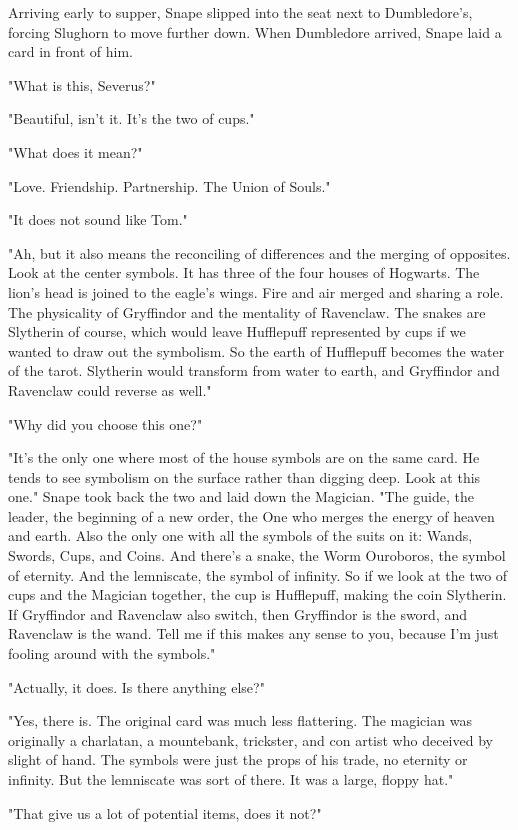 \documentclass[a4paper,11pt]{article}
\begin{document}
Arriving early to supper, Snape slipped into the seat next to Dumbledore's, forcing Slughorn to move further down. When Dumbledore arrived, Snape laid a card in front of him.

"What is this, Severus?"

"Beautiful, isn't it. It's the two of cups."

"What does it mean?"

"Love. Friendship. Partnership. The Union of Souls."

"It does not sound like Tom."

"Ah, but it also means the reconciling of differences and the merging of opposites. Look at the center symbols. It has three of the four houses of Hogwarts. The lion's head is joined to the eagle's wings. Fire and air merged and sharing a role. The physicality of Gryffindor and the mentality of Ravenclaw. The snakes are Slytherin of course, which would leave Hufflepuff represented by cups if we wanted to draw out the symbolism. So the earth of Hufflepuff becomes the water of the tarot. Slytherin would transform from water to earth, and Gryffindor and Ravenclaw could reverse as well."

"Why did you choose this one?"

"It's the only one where most of the house symbols are on the same card. He tends to see symbolism on the surface rather than digging deep. Look at this one." Snape took back the two and laid down the Magician. "The guide, the leader, the beginning of a new order, the One who merges the energy of heaven and earth. Also the only one with all the symbols of the suits on it: Wands, Swords, Cups, and Coins. And there's a snake, the Worm Ouroboros, the symbol of eternity. And the lemniscate, the symbol of infinity. So if we look at the two of cups and the Magician together, the cup is Hufflepuff, making the coin Slytherin. If Gryffindor and Ravenclaw also switch, then Gryffindor is the sword, and Ravenclaw is the wand. Tell me if this makes any sense to you, because I'm just fooling around with the symbols."

"Actually, it does. Is there anything else?"

"Yes, there is. The original card was much less flattering. The magician was originally a charlatan, a mountebank, trickster, and con artist who deceived by slight of hand. The symbols were just the props of his trade, no eternity or infinity. But the lemniscate was sort of there. It was a large, floppy hat."

"That give us a lot of potential items, does it not?"
\end{document}

